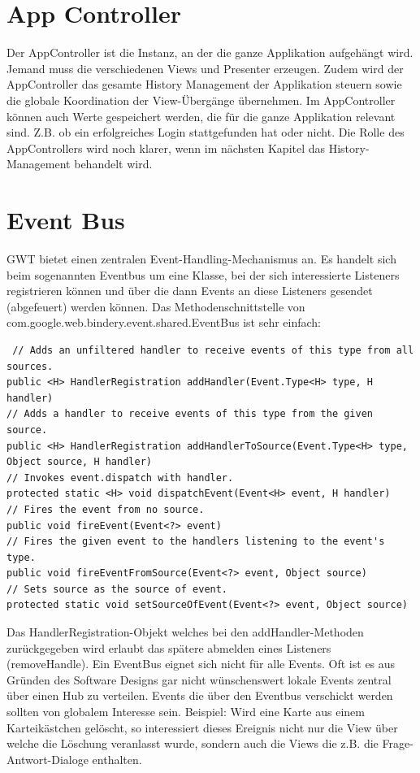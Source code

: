 \documentclass[a4paper,10pt]{scrreprt}
\begin{document}
\section{App Controller}
Der AppController ist die Instanz, an der die ganze Applikation aufgehängt wird. Jemand muss die
verschiedenen Views und Presenter erzeugen. Zudem wird der AppController das gesamte History
Management der Applikation steuern sowie die globale Koordination der View-Übergänge
übernehmen. Im AppController können auch Werte gespeichert werden, die für die ganze Applikation
relevant sind. Z.B. ob ein erfolgreiches Login stattgefunden hat oder nicht. Die Rolle des
AppControllers wird noch klarer, wenn im nächsten Kapitel das History-Management behandelt wird.

\section{Event Bus}
GWT bietet einen zentralen Event-Handling-Mechanismus an. Es handelt sich beim sogenannten
Eventbus um eine Klasse, bei der sich interessierte Listeners registrieren können und über die dann
Events an diese Listeners gesendet (abgefeuert) werden können. Das Methodenschnittstelle von
com.google.web.bindery.event.shared.EventBus ist sehr einfach:
\begin{lstlisting}
 // Adds an unfiltered handler to receive events of this type from all sources.
public <H> HandlerRegistration addHandler(Event.Type<H> type, H handler)
// Adds a handler to receive events of this type from the given source.
public <H> HandlerRegistration addHandlerToSource(Event.Type<H> type,
Object source, H handler)
// Invokes event.dispatch with handler.
protected static <H> void dispatchEvent(Event<H> event, H handler)
// Fires the event from no source.
public void fireEvent(Event<?> event)
// Fires the given event to the handlers listening to the event's type.
public void fireEventFromSource(Event<?> event, Object source)
// Sets source as the source of event.
protected static void setSourceOfEvent(Event<?> event, Object source)
\end{lstlisting}


Das HandlerRegistration-Objekt welches bei den addHandler-Methoden zurückgegeben wird erlaubt
das spätere abmelden eines Listeners (removeHandle).
Ein EventBus eignet sich nicht für alle Events. Oft ist es aus Gründen des Software Designs gar nicht
wünschenswert lokale Events zentral über einen Hub zu verteilen. Events die über den Eventbus
verschickt werden sollten von globalem Interesse sein. Beispiel: Wird eine Karte aus einem
Karteikästchen gelöscht, so interessiert dieses Ereignis nicht nur die View über welche die Löschung
veranlasst wurde, sondern auch die Views die z.B. die Frage-Antwort-Dialoge enthalten.
\end{document}
